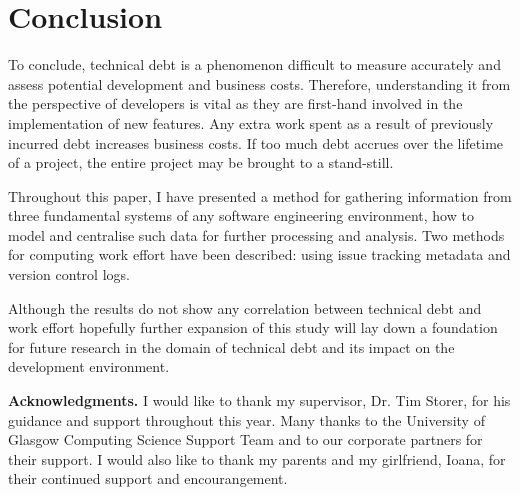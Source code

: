 \documentclass{mpaper}
\begin{document}
\section{Conclusion}
\label{conclusion}

To conclude, technical debt is a phenomenon difficult to measure accurately and
assess potential development and business costs. Therefore, understanding it
from the perspective of developers is vital as they are first-hand involved in
the implementation of new features. Any extra work spent as a result of
previously incurred debt increases business costs. If too much debt accrues over
the lifetime of a project, the entire project may be brought to a stand-still.

Throughout this paper, I have presented a method for gathering information from
three fundamental systems of any software engineering environment, how to model
and centralise such data for further processing and analysis. Two methods for
computing work effort have been described: using issue tracking metadata and
version control logs. 

Although the results do not show any correlation between technical debt and work
effort hopefully further expansion of this study will lay down a foundation for
future research in the domain of technical debt and its impact on the
development environment.

{\bf Acknowledgments.} I would like to thank my supervisor, Dr. Tim Storer, for
his guidance and support throughout this year. Many thanks to the University of
Glasgow Computing Science Support Team and to our corporate partners for their
support. I would also like to thank my parents and my girlfriend, Ioana, for
their continued support and encourangement. 



\end{document}
